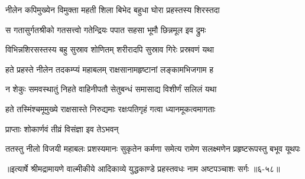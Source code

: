 \twolineshloka
{नीलेन कपिमुख्येन विमुक्ता महती शिला}
{बिभेद बहुधा घोरा प्रहस्तस्य शिरस्तदा} %

\twolineshloka
{स गतासुर्गतश्रीको गतसत्त्वो गतेन्द्रियः}
{पपात सहसा भूमौ छिन्नमूल इव द्रुमः} %

\twolineshloka
{विभिन्नशिरसस्तस्य बहु सुस्राव शोणितम्}
{शरीरादपि सुस्राव गिरेः प्रस्रवणं यथा} %

\twolineshloka
{हते प्रहस्ते नीलेन तदकम्प्यं महाबलम्}
{राक्षसानामहृष्टानां लङ्कामभिजगाम ह} %

\twolineshloka
{न शेकुः समवस्थातुं निहते वाहिनीपतौ}
{सेतुबन्धं समासाद्य विशीर्णं सलिलं यथा} %

\twolineshloka
{हते तस्मिंश्चमूमुख्ये राक्षसास्ते निरुद्यमाः}
{रक्षःपतिगृहं गत्वा ध्यानमूकत्वमागताः} %

\onelineshloka
{प्राप्ताः शोकार्णवं तीव्रं विसंज्ञा इव तेऽभवन्} %

\twolineshloka
{ततस्तु नीलो विजयी महाबलः प्रशस्यमानः सुकृतेन कर्मणा}
{समेत्य रामेण सलक्ष्मणेन प्रहृष्टरूपस्तु बभूव यूथपः} %


॥इत्यार्षे श्रीमद्रामायणे वाल्मीकीये आदिकाव्ये युद्धकाण्डे प्रहस्तवधः नाम अष्टपञ्चाशः सर्गः ॥६-५८॥
